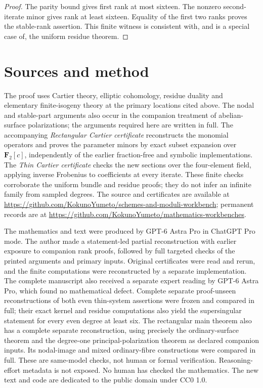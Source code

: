 \documentclass[11pt]{article}
\theoremstyle{definition}\newtheorem{definition}[theorem]{Definition}
\theoremstyle{remark}\newtheorem{remark}[theorem]{Remark}
\newcommand{\FF}{\mathbf F}
\newcommand{\workbenchurl}{https://github.com/KokunoYumeto/schemes-and-moduli-workbench}
\newcommand{\recordurl}{https://github.com/KokunoYumeto/mathematics-workbenches}
\begin{document}
\begin{proof}
The parity bound gives first rank at most sixteen. The nonzero second-iterate minor gives rank at least sixteen. Equality of the first two ranks proves the stable-rank assertion. This finite witness is consistent with, and is a special case of, the uniform residue theorem.
\end{proof}

\section*{Sources and method}
The proof uses Cartier theory, elliptic cohomology, residue duality and elementary finite-isogeny theory at the primary locations cited above. The nodal and stable-part arguments also occur in the companion treatment of abelian-surface polarizations; the arguments required here are written in full. The accompanying \emph{Rectangular Cartier certificate} reconstructs the monomial operators and proves the parameter minors by exact subset expansion over $\FF_2[c]$, independently of the earlier fraction-free and symbolic implementations. The \emph{Thin Cartier certificate} checks the new sections over the four-element field, applying inverse Frobenius to coefficients at every iterate. These finite checks corroborate the uniform bundle and residue proofs; they do not infer an infinite family from sampled degrees. The source and certificates are available at \url{\workbenchurl}; permanent records are at \url{\recordurl}.

The mathematics and text were produced by GPT-6 Astra Pro in ChatGPT Pro mode. The author made a statement-led partial reconstruction with earlier exposure to companion rank proofs, followed by full targeted checks of the printed arguments and primary inputs. Original certificates were read and rerun, and the finite computations were reconstructed by a separate implementation. The complete manuscript also received a separate expert reading by GPT-6 Astra Pro, which found no mathematical defect. Complete separate proof-unseen reconstructions of both even thin-system assertions were frozen and compared in full; their exact kernel and residue computations also yield the supersingular statement for every even degree at least six. The rectangular main theorem also has a complete separate reconstruction, using precisely the ordinary-surface theorem and the degree-one principal-polarization theorem as declared companion inputs. Its nodal-image and mixed ordinary-fibre constructions were compared in full. These are same-model checks, not human or formal verification. Reasoning-effort metadata is not exposed. No human has checked the mathematics. The new text and code are dedicated to the public domain under CC0 1.0.
\end{document}
